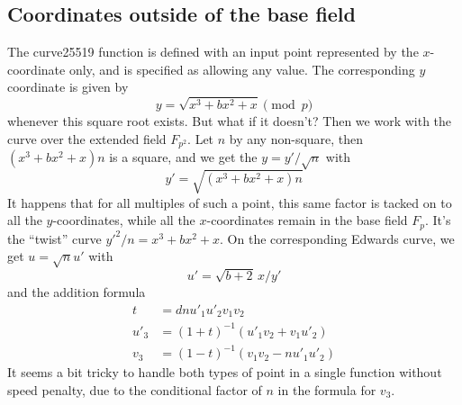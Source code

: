 \documentclass[a4paper]{article}
\begin{document}
\subsection{Coordinates outside of the base field}

The curve25519 function is defined with an input point represented by
the $x$-coordinate only, and is specified as allowing any value. The
corresponding $y$ coordinate is given by 
\begin{equation*}
  y = \sqrt{x^3 + b x^2 + x} \pmod p
\end{equation*}
whenever this square root exists. But what if it doesn't? Then we work
with the curve over the extended field $F_{p^2}$. Let $n$ by any
non-square, then $(x^3 + b x^2 + x) n$ is a square, and we get the
$y = y' / \sqrt{n}$ with
\begin{equation*}
  y' = \sqrt{(x^3 + b x^2 + x) n}
\end{equation*}
It happens that for all multiples of such a point, this same factor is
tacked on to all the $y$-coordinates, while all the $x$-coordinates
remain in the base field $F_p$. It's the ``twist'' curve $y'^2 / n =
x^3 + bx^2 + x$. On the corresponding Edwards curve, we
get $u = \sqrt{n} u'$ with
\begin{equation*}
  u' = \sqrt{b+2} \, x / y'
\end{equation*}
and the addition formula
\begin{align*}
  t &= d n u'_1 u'_2 v_1 v_2 \\
  u'_3 &= (1+t)^{-1}(u'_1v_2 + v_1 u'_2) \\
  v_3 &= (1-t)^{-1}(v_1 v_2 - n u'_1 u'_2)
\end{align*}
It seems a bit tricky to handle both types of point in a single
function without speed penalty, due to the conditional factor of $n$
in the formula for $v_3$.
\end{document}
